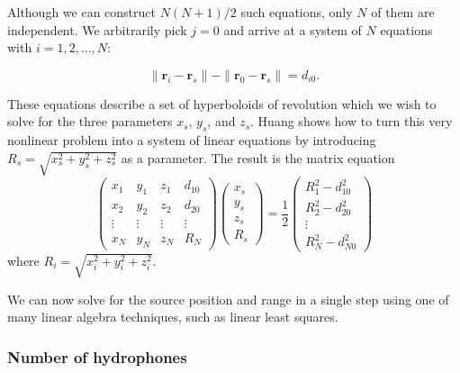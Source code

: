 \documentclass[10pt]{article}
\begin{document}
Although we can construct \(N(N+1)/2\) such equations, only \(N\) of them are independent.  We arbitrarily pick \(j=0\) and arrive at a system of \(N\) equations with \(i=1,2,\dots,N\):

\begin{equation}\label{eq:hyperboloid-i0}
\|\mathbf{r}_i-\mathbf{r}_s\|-\|\mathbf{r}_0-\mathbf{r}_s\|=d_{i0}.
\end{equation}

These equations describe a set of hyperboloids of revolution which we wish to solve for the three parameters \(x_s\), \(y_s\), and \(z_s\).  Huang \cite{Huang} shows how to turn this very nonlinear problem into a system of linear equations by introducing \(R_s=\sqrt{x_s^2+y_s^2+z_s^2}\) as a parameter.  The result is the matrix equation
\begin{equation}\label{eq:hyperboloids-matrix}
\left(
\begin{array}{cccc}
x_1 & y_1 & z_1 & d_{10} \\
x_2 & y_2 & z_2 & d_{20} \\
\vdots  & \vdots  & \vdots & \vdots \\
x_N & y_N & z_N & R_N
\end{array}
\right)\left(
\begin{array}{c}
x_s \\
y_s \\
z_s \\
R_s
\end{array}
\right)=\frac{1}{2}\left(
\begin{array}{c}
R_1^2-d_{10}^2 \\
R_2^2-d_{20}^2 \\
\vdots \\
R_N^2-d_{N0}^2
\end{array}
\right)
\end{equation}
where \(R_i=\sqrt{x_i^2+y_i^2+z_i^2}\).

We can now solve for the source position and range in a single step using one of many linear algebra techniques, such as linear least squares.

\subsubsection{Number of hydrophones}
\end{document}
